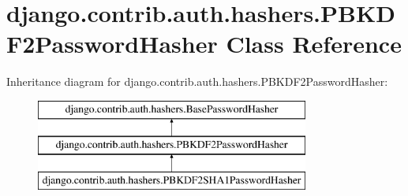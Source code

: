 \hypertarget{classdjango_1_1contrib_1_1auth_1_1hashers_1_1_p_b_k_d_f2_password_hasher}{}\section{django.\+contrib.\+auth.\+hashers.\+P\+B\+K\+D\+F2\+Password\+Hasher Class Reference}
\label{classdjango_1_1contrib_1_1auth_1_1hashers_1_1_p_b_k_d_f2_password_hasher}
Inheritance diagram for django.\+contrib.\+auth.\+hashers.\+P\+B\+K\+D\+F2\+Password\+Hasher\+:\begin{figure}[H]
\begin{center}
\leavevmode
\includegraphics[height=3.000000cm]{classdjango_1_1contrib_1_1auth_1_1hashers_1_1_p_b_k_d_f2_password_hasher}
\end{center}
\end{figure}
